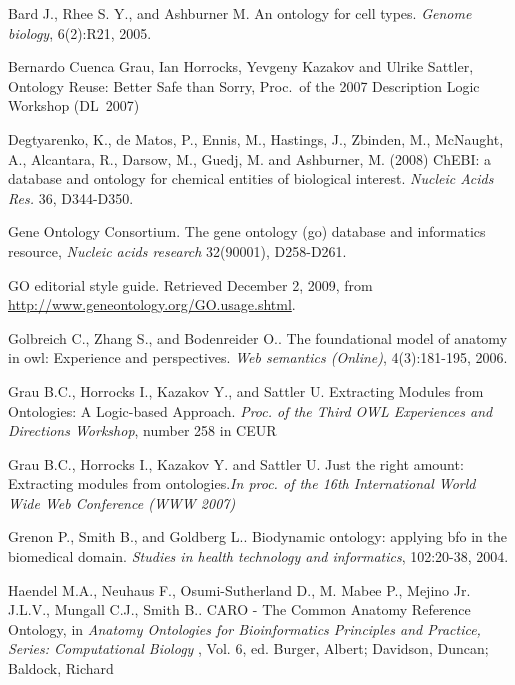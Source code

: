 \documentclass[jou]{ao2e}%
\begin{document}
\begin{thebibliography}{}

 Bard J., Rhee S. Y., and Ashburner M. An ontology for cell types. \textit{Genome biology}, 6(2):R21, 2005. 

Bernardo {Cuenca Grau}, Ian Horrocks, Yevgeny Kazakov and Ulrike Sattler,
Ontology Reuse: Better Safe than Sorry, Proc.\ of the 2007 Description Logic Workshop (DL~2007)

 Degtyarenko, K., de Matos, P., Ennis, M., Hastings, J., Zbinden, M., McNaught, A., Alcantara, R., Darsow, M., Guedj, M. and Ashburner, M. (2008) ChEBI: a database and ontology for chemical entities of biological interest. \textit{Nucleic Acids Res.} 36, D344-D350.

Gene Ontology Consortium. The gene ontology (go) database and informatics resource, \textit{Nucleic acids research} 32(90001), D258-D261.

 GO editorial style guide. Retrieved December 2, 2009, from \url{http://www.geneontology.org/GO.usage.shtml}.

 Golbreich C., Zhang S., and Bodenreider O.. The foundational model of anatomy in owl: Experience and perspectives. \textit{Web semantics (Online)}, 4(3):181-195, 2006. 

 Grau B.C., Horrocks I., Kazakov Y., and Sattler U. Extracting Modules from Ontologies: A Logic-based Approach. \textit{Proc. of the Third OWL Experiences and Directions Workshop}, number 258 in CEUR

 Grau B.C., Horrocks I., Kazakov Y. and Sattler U. Just the right amount: Extracting modules from ontologies.\textit{In proc. of the 16th International World Wide Web Conference (WWW 2007)}

 Grenon P., Smith B., and Goldberg L.. Biodynamic ontology: applying bfo in the biomedical domain. \textit{Studies in health 
technology and informatics}, 102:20-38, 2004. 

 Haendel M.A., Neuhaus F., Osumi-Sutherland D., M. Mabee P., Mejino Jr. J.L.V., Mungall C.J., Smith B.. CARO - The Common Anatomy Reference Ontology, in \textit{Anatomy Ontologies for Bioinformatics Principles and Practice, Series: Computational Biology} , Vol. 6, ed. Burger, Albert; Davidson, Duncan; Baldock, Richard


\end{thebibliography}
\end{document}
